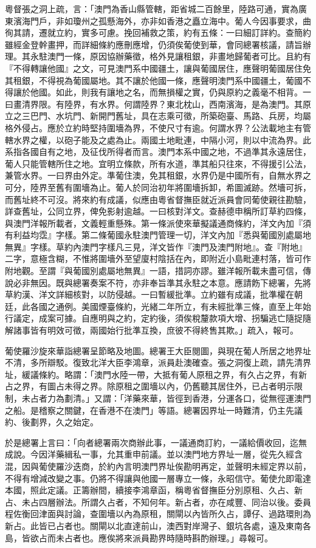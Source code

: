 \begin{pinyinscope}
粵督張之洞上疏，言：「澳門為香山縣管轄，距省城二百餘里，陸路可通，實為廣東濱海門戶，非如瓊州之孤懸海外，亦非如香港之矗立海中。葡人今因事要求，曲徇其請，遷就立約，實多可慮。挽回補救之策，約有五條：一曰細訂詳約。查簡約雖經金登幹畫押，而詳細條約應刪應增，仍須俟葡使到華，會同總署核議，請旨辦理。其永駐澳門一條，原因協辦藥徵，格外見讓租銀，非畫地歸葡者可比。且約有『不得轉讓他國』之文，可見澳門系中國疆土，讓與葡國居住，應聲明葡國居住免其租銀，不得視為葡國屬地。其不讓於他國一條，應聲明澳門系中國疆土，葡國不得讓於他國。如此，則我有讓地之名，而無損權之實，仍與原約之義毫不相背。一曰畫清界限。有陸界，有水界。何謂陸界？東北枕山，西南濱海，是為澳門。其原立之三巴門、水坑門、新開門舊址，具在志乘可徵，所築砲臺、馬路、兵房，均屬格外侵占。應於立約時堅持圍墻為界，不使尺寸有逾。何謂水界？公法載地主有管轄水界之權，以砲子能及之處為止。兩國土地毗連，中隔小河，則以中流為界。此系指各國自有之地，及征伐所得者而言。澳門本系中國之地，不過準其永遠居住，葡人只能管轄所住之地。宜明立條款，所有水道，準其船只往來，不得援引公法，兼管水界。一曰界由外定。準葡住澳，免其租銀，水界仍是中國所有，自無水界之可分，陸界至舊有圍墻為止。葡人於同治初年將圍墻拆卸，希圖滅跡。然墻可拆，而舊址終不可沒。將來約有成議，似應由粵省督撫臣就近派員會同葡使親往勘驗，詳查舊址，公同立界，俾免影射逾越。一曰核對洋文。查赫德申稱所訂草約四條，與澳門洋報所載者，文義輕重懸殊。第一條派使來華擬議通商條約，洋文內加『須有利益均霑』字樣。第二條葡國永駐澳門管理一切，洋文內加『悉與葡國別處屬地無異』字樣。草約內澳門字樣凡三見，洋文皆作『澳門及澳門附地』。查『附地』二字，意極含糊，不惟將圍墻外至望廈村陰括在內，即附近小島毗連村落，皆可作附地觀。至謂『與葡國別處屬地無異』一語，措詞亦謬。雖洋報所載未盡可信，傳說必非無因。既與總署奏案不符，亦非奉旨準其永駐之本意。應請飭下總署，先將草約漢、洋文詳細核對，以防侵越。一曰暫緩批準。立約雖有成議，批準權在朝廷，此各國之通例。美國煙臺條約，光緒二年所立，有未經批準三條，直至上年始行議定，成案可據。自應明與之約，定約後，須俟稅釐款項大增、拐騙逃亡隨捉隨解諸事皆有明效可徵，兩國始行批準互換，庶彼不得終售其欺。」疏入，報可。

葡使羅沙旋來華詣總署呈節略及地圖。總署王大臣閱圖，與現在葡人所居之地界址不清，多所辯駁。復致北洋大臣李鴻章，派員赴澳確查。張之洞復上疏，請先清界址，緩議條約。略謂：「澳門水陸一帶，大抵有葡人原租之界，有久占之界，有新占之界，有圖占未得之界。除原租之圍墻以內，仍舊聽其居住外，已占者明示限制，未占者力為劃清。」又謂：「洋藥來華，皆徑到香港，分運各口，從無徑運澳門之船。是稽察之關鍵，在香港不在澳門」等語。總署因界址一時難清，仍主先議約、後劃界，久之始定。

於是總署上言曰：「向者總署兩次商辦此事，一議通商訂約，一議給價收回，迄無成說。今因洋藥緝私一事，允其重申前議。並以澳門地方界址一層，從先久經含混，因與葡使羅沙迭商，於約內言明澳門界址俟勘明再定，並聲明未經定界以前，不得有增減改變之事。仍將不得讓與他國一層專立一條，永昭信守。葡使允即電達本國，照此定議。正籌辦間，續接李鴻章函，稱粵省督撫臣分別原租、久占、新占、未占四層辦法。所謂久占者，不知何年。新占者，亦在咸豐、同治以後。委員程佐衡回津面與討論，查圍墻以內為原租，關閘以內皆所久占，譚仔、過路環則為新占。此皆已占者也。關閘以北直達前山，澳西對岸灣子、銀坑各處，遠及東南各島，皆欲占而未占者也。應俟將來派員勘界時隨時斟酌辦理。」尋報可。


\end{pinyinscope}
